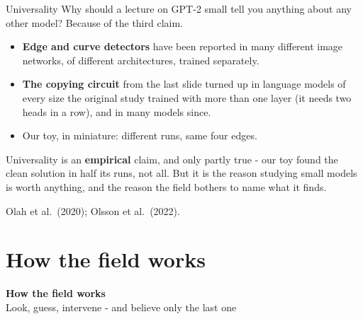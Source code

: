 \documentclass[aspectratio=169]{beamer}
\newcommand{\watchbox}[1]{%
  \begin{tcolorbox}[colback=armorange!12, colframe=armorange, boxrule=0.6pt, arc=2pt]
  #1
  \end{tcolorbox}}
\newcommand{\sectiontransition}[2]{%
  \begin{frame}[plain]
    \vfill
    \begin{center}
      {\Huge\bfseries\color{popblue} #1}\\[1.1em]
      {\large #2}
    \end{center}
    \vfill
  \end{frame}}
\begin{document}
\begin{frame}{Universality}
  \vspace{0.6em}
  Why should a lecture on GPT-2 small tell you anything about any other model? Because of the third
  claim.

  \vspace{0.5em}
  \begin{itemize}
    \item \textbf{Edge and curve detectors} have been reported in many different image networks,
      of different architectures, trained separately.
    \item \textbf{The copying circuit} from the last slide turned up in language models of every
      size the original study trained with more than one layer (it needs two heads in a row), and
      in many models since.
    \item Our toy, in miniature: different runs, same four edges.
  \end{itemize}

  \vspace{0.4em}
  \watchbox{Universality is an \textbf{empirical} claim, and only partly true - our toy found the
  clean solution in half its runs, not all. But it is the reason studying small models is worth
  anything, and the reason the field bothers to name what it finds.}

  \vspace{0.3em}
  {\footnotesize Olah et al.\ (2020); Olsson et al.\ (2022).}
\end{frame}

\section{How the field works}
\sectiontransition{How the field works}{Look, guess, intervene - and believe only the last one}
\end{document}
